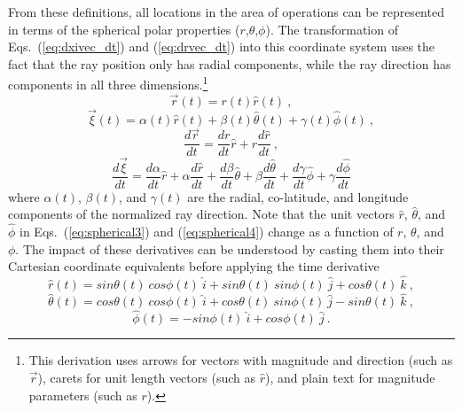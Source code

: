 \documentclass{ws-jca}
\begin{document}
From these definitions, all locations in the area of operations can be
represented in terms of the spherical polar properties
($r$,\(\theta\),\(\phi\)). The transformation of Eqs.~(\ref{eq:dxivec_dt})
and (\ref{eq:drvec_dt}) into this coordinate system uses the fact that the
ray position only has radial components, while the ray direction has
components in all three dimensions.\footnote{This derivation uses arrows for
vectors with magnitude and direction (such as \(\vec{r}\)), carets for unit
length vectors (such as \(\hat{r}\)), and plain text for magnitude
parameters (such as $r$).}
\begin{equation}
	\vec{r}(t) = r(t) \hat{r}(t) \:,
	\label{eq:spherical1}
\end{equation}
\begin{equation}
	\vec{\xi}(t) = \alpha(t) \hat{r}(t) + \beta(t) \hat{\theta}(t) 
		+ \gamma(t) \hat{\phi}(t) \:,
	\label{eq:spherical2}
\end{equation}
\begin{equation}
	\frac{d\vec{r}}{dt} = \frac{dr}{dt} \hat{r} + r \frac{d\hat{r}}{dt} \:,
	\label{eq:spherical3}
\end{equation}
\begin{equation}
	\frac{d\vec{\xi}}{dt} = \frac{d\alpha}{dt} \hat{r} + \alpha \frac{d\hat{r}}{dt}
	+ \frac{d\beta}{dt} \hat{\theta} + \beta \frac{d\hat{\theta}}{dt}
	+ \frac{d\gamma}{dt} \hat{\phi} + \gamma \frac{d\hat{\phi}}{dt}
\label{eq:spherical4}
\end{equation}
where 
\(\alpha(t)\), \(\beta(t)\), and \(\gamma(t)\) are the radial,
co-latitude, and longitude components of the normalized ray direction.
Note that the unit vectors \(\hat{r}\), \(\hat{\theta}\), and \(\hat{\phi}\) 
in Eqs.~(\ref{eq:spherical3}) and (\ref{eq:spherical4})
change as a function of $r$, \(\theta\),
and \(\phi\). The impact of these derivatives can be understood by casting
them into their Cartesian coordinate equivalents before applying the time
derivative
\begin{equation}
	\hat{r}(t) = sin\theta(t) \: cos\phi(t) \: \hat{i}
		+ sin\theta(t) \: sin\phi(t) \: \hat{j}
		+ cos\theta(t) \: \hat{k} \:,
	\label{eq:rhat}
\end{equation}
\begin{equation}
	\hat{\theta}(t) = cos\theta(t) \: cos\phi(t) \: \hat{i}
		+ cos\theta(t) \: sin\phi(t) \: \hat{j}
		- sin\theta(t) \: \hat{k} \:,
	\label{eq:thetahat}
\end{equation}
\begin{equation}
	\hat{\phi}(t) = - sin\phi(t) \: \hat{i} + cos\phi(t) \: \hat{j} \:.
	\label{eq:phihat}
\end{equation}
\end{document}
